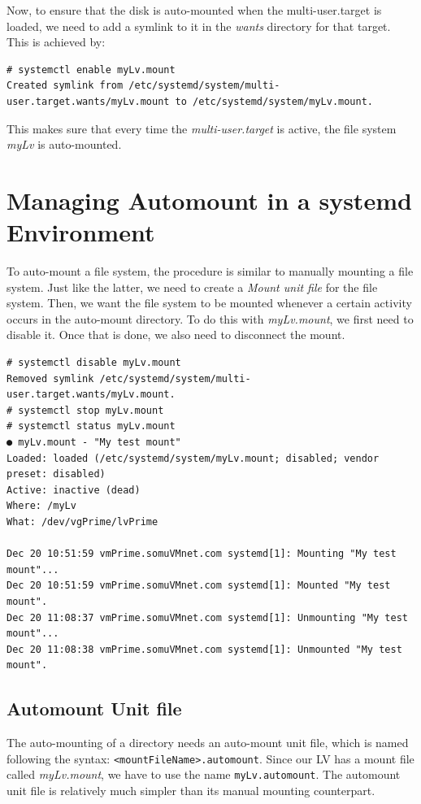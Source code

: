 \noindent
Now, to ensure that the disk is auto-mounted when the multi-user.target is loaded, we need to add a symlink to it in the \textit{wants} directory for that target. This is achieved by:

\vspace{-15pt}
\begin{verbatim}
# systemctl enable myLv.mount 
Created symlink from /etc/systemd/system/multi-user.target.wants/myLv.mount to /etc/systemd/system/myLv.mount.
\end{verbatim}
\vspace{-10pt}

\noindent
This makes sure that every time the \textit{multi-user.target} is active, the file system \textit{myLv} is auto-mounted. 

	\section{Managing Automount in a systemd Environment}
To auto-mount a file system, the procedure is similar to manually mounting a file system. Just like the latter, we need to create a \textit{Mount unit file} for the file system. Then, we want the file system to be mounted whenever a certain activity occurs in the auto-mount directory. To do this with \textit{myLv.mount}, we first need to disable it. Once that is done, we also need to disconnect the mount.

\vspace{-15pt}
\begin{verbatim}
# systemctl disable myLv.mount 
Removed symlink /etc/systemd/system/multi-user.target.wants/myLv.mount.
# systemctl stop myLv.mount 
# systemctl status myLv.mount 
● myLv.mount - "My test mount"
Loaded: loaded (/etc/systemd/system/myLv.mount; disabled; vendor preset: disabled)
Active: inactive (dead)
Where: /myLv
What: /dev/vgPrime/lvPrime

Dec 20 10:51:59 vmPrime.somuVMnet.com systemd[1]: Mounting "My test mount"...
Dec 20 10:51:59 vmPrime.somuVMnet.com systemd[1]: Mounted "My test mount".
Dec 20 11:08:37 vmPrime.somuVMnet.com systemd[1]: Unmounting "My test mount"...
Dec 20 11:08:38 vmPrime.somuVMnet.com systemd[1]: Unmounted "My test mount".
\end{verbatim}
\vspace{-10pt}

\subsection{Automount Unit file}
The auto-mounting of a directory needs an auto-mount unit file, which is named following the syntax: \verb|<mountFileName>.automount|. Since our LV has a mount file called \textit{myLv.mount}, we have to use the name \verb|myLv.automount|. The automount unit file is relatively much simpler than its manual mounting counterpart.

